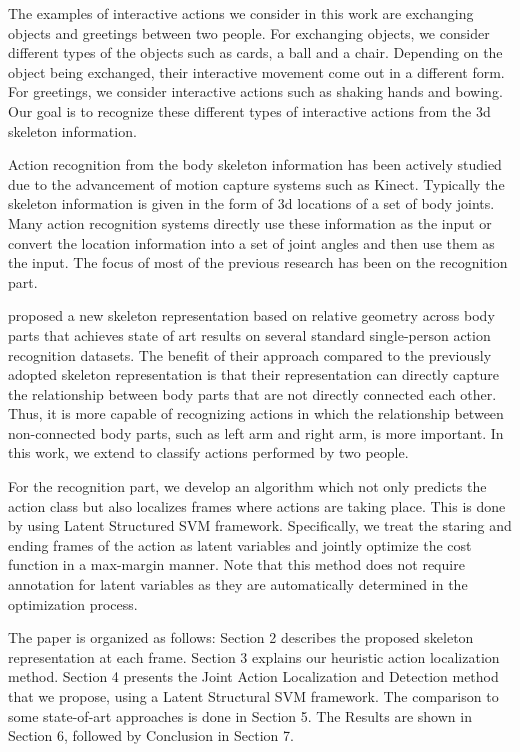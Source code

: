 \documentclass[10pt,twocolumn,letterpaper]{article}
\begin{document}
The examples of interactive actions we consider in this work are exchanging objects and greetings between two people. For exchanging objects, we consider different types of the objects such as cards, a ball and a chair. Depending on the object being exchanged, their interactive movement come out in a different form. For greetings, we consider interactive actions such as shaking hands and bowing. Our goal is to recognize these different types of interactive actions from the 3d skeleton information.


Action recognition from the body skeleton information has been actively studied due to the advancement of motion capture systems such as Kinect. Typically the skeleton information is given in the form of 3d locations of a set of body joints. Many action recognition systems directly use these information as the input or convert the location information into a set of joint angles and then use them as the input. The focus of most of the previous research has been on the recognition part. 

\cite{Vemulapalli2013} proposed a new skeleton representation based on relative geometry across body parts that achieves state of art results on several standard single-person action recognition datasets. The benefit of their approach compared to the previously adopted skeleton representation is that their representation can directly capture the relationship between body parts that are not directly connected each other. Thus, it is more capable of recognizing actions in which the relationship between non-connected body parts, such as left arm and right arm, is more important. In this work, we extend \cite{Vemulapalli2013} to classify actions performed by two people.


For the recognition part, we develop an algorithm which not only predicts the action class but also localizes frames where actions are taking place. This is done by using Latent Structured SVM framework. Specifically, we treat the staring and ending frames of the action as latent variables and jointly optimize the cost function in a max-margin manner. Note that this method does not require annotation for latent variables as they are automatically determined in the optimization process.


The paper is organized as follows: Section 2 describes the proposed skeleton representation at each frame. Section 3 explains our heuristic action localization method. Section 4 presents the Joint Action Localization and Detection method that we propose, using a Latent Structural SVM framework. The comparison to some state-of-art approaches is done in Section 5. The Results are shown in Section 6, followed by Conclusion in Section 7.
\end{document}

